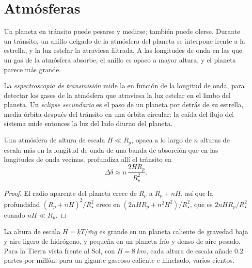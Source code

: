 \section{Atmósferas}\label{sec:b3:exoplanets:atmospheres}

Un planeta en tránsito puede pesarse y medirse; también puede olerse.
Durante un tránsito, un anillo delgado de la atmósfera del planeta se interpone
frente a la estrella, y la luz estelar la atraviesa filtrada. A las longitudes de onda
en las que un gas de la atmósfera absorbe, el anillo es opaco a mayor altura,
y el planeta parece más grande.

\begin{definition}\label{def:b3:exoplanets:transmission}
La \emph{espectroscopía de transmisión} mide
la  en función de la longitud de onda, para detectar los gases de la
atmósfera que atraviesa la luz estelar en el limbo del planeta. Un
\emph{eclipse secundario} es el paso de un
planeta por detrás de su estrella, media órbita después del tránsito en una
órbita circular; la caída del flujo del sistema mide entonces la luz del
lado diurno del planeta.
\end{definition}

\begin{proposition}\label{prop:b3:exoplanets:transmission}
Una atmósfera de altura de escala $H \ll R_p$, opaca a lo largo de $n$ alturas de escala
más en la longitud de onda de una banda de absorción que en las longitudes de onda vecinas,
profundiza allí el tránsito en
\[
\Delta\delta \approx n\,\frac{2HR_p}{R_\star^2} .
\]
\end{proposition}

\begin{proof}
El radio aparente del planeta crece de $R_p$ a $R_p + nH$, así que la
profundidad $(R_p + nH)^2/R_\star^2$ crece en $(2nHR_p + n^2H^2)/R_\star^2$,
que es $2nHR_p/R_\star^2$ cuando $nH \ll R_p$.
\end{proof}

La altura de escala $H = kT/\bar m g$ es grande en un planeta caliente de gravedad
baja y aire ligero de hidrógeno, y pequeña en un planeta frío y denso de aire
pesado. Para la Tierra vista frente al Sol, con $H = \qty{8}{km}$,
cada altura de escala añade 0.2 partes por millón; para un gigante gaseoso caliente e hinchado,
varios cientos.

